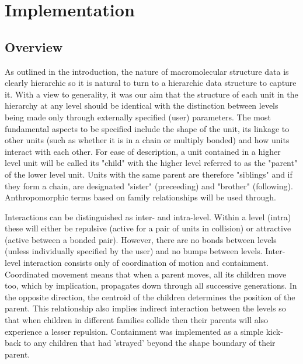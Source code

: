 \section{Implementation}

\subsection{Overview}

As outlined in the introduction, the nature of macromolecular
structure data is clearly hierarchic so it is natural to turn to a
hierarchic data structure to capture it.  With a view to generality,
it was our aim that the structure of each unit in the hierarchy at 
any level should be identical with the distinction between levels
being made only through externally specified (user) parameters.
The most fundamental aspects to be specified include the shape of
the unit, its linkage to other units (such as whether it is in a
chain or multiply bonded) and how units interact with each other.
For ease of description, a unit contained in a higher level unit
will be called its "child" with the higher level referred to as
the "parent" of the lower level unit.   Units with the same parent
are therefore "siblings" and if they form a chain, are designated
"sister" (preceeding) and "brother" (following).   Anthropomorphic
terms based on family relationships will be used through.

Interactions can be distinguished as inter- and intra-level.
Within a level (intra) these will either be repulsive (active for
a pair of units in collision) or attractive (active between a
bonded pair).  However, there are no bonds between levels
(unless individually specified by the user) and no bumps between
levels.  Inter-level interaction consists only of coordination of
motion and containment.  Coordinated movement means that when a parent
moves, all its children move too, which by implication, propagates
down through all successive generations.  In the opposite direction,
the centroid of the children determines the position of the parent. 
This relationship also implies indirect interaction between the 
levels so that when children in different families collide then
their parents will also experience a lesser repulsion.
Containment was implemented as a simple kick-back to any children
that had 'strayed' beyond the shape boundary of their parent.

